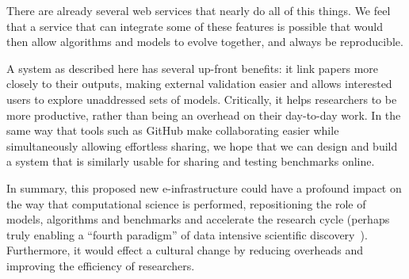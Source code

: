 \documentclass[conference]{IEEEtran}
\begin{document}
There are already several web services that nearly do all of this
things. We feel that a service that can integrate some of these
features is possible that would then allow algorithms and models to
evolve together, and always be reproducible.

A system as described here has several up-front benefits: it link
papers more closely to their outputs, making external validation
easier and allows interested users to explore unaddressed sets of
models. Critically, it helps researchers to be more productive, rather
than being an overhead on their day-to-day work. In the same way that
tools such as GitHub make collaborating easier while simultaneously
allowing effortless sharing, we hope that we can design and build a
system that is similarly usable for sharing and testing benchmarks
online.

In summary, this proposed new e-infrastructure could have a profound
impact on the way that computational science is performed,
repositioning the role of models, algorithms and benchmarks and
accelerate the research cycle (perhaps truly enabling a ``fourth
paradigm'' of data intensive scientific
discovery~\cite{hey:2009}). Furthermore, it would effect a cultural
change by reducing overheads and improving the efficiency of
researchers.





\end{document}
